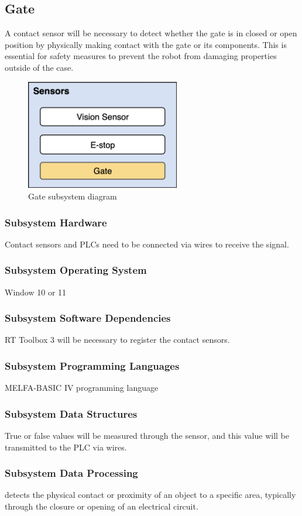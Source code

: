 \subsection{Gate}
A contact sensor will be necessary to detect whether the gate is in closed or open position by physically making contact with the gate or its components. This is essential for safety measures to prevent the robot from damaging properties outside of the case.

\begin{figure}[h!]
	\centering
 	\includegraphics[width=0.60\textwidth]{images/Gate}
 \caption{Gate subsystem diagram}
\end{figure}

\subsubsection{Subsystem Hardware}
Contact sensors and PLCs need to be connected via wires to receive the signal.

\subsubsection{Subsystem Operating System}
Window 10 or 11

\subsubsection{Subsystem Software Dependencies}
RT Toolbox 3 will be necessary to register the contact sensors.

\subsubsection{Subsystem Programming Languages}
MELFA-BASIC IV programming language

\subsubsection{Subsystem Data Structures}
True or false values will be measured through the sensor, and this value will be transmitted to the PLC via wires.

\subsubsection{Subsystem Data Processing}
detects the physical contact or proximity of an object to a specific area, typically through the closure or opening of an electrical circuit.